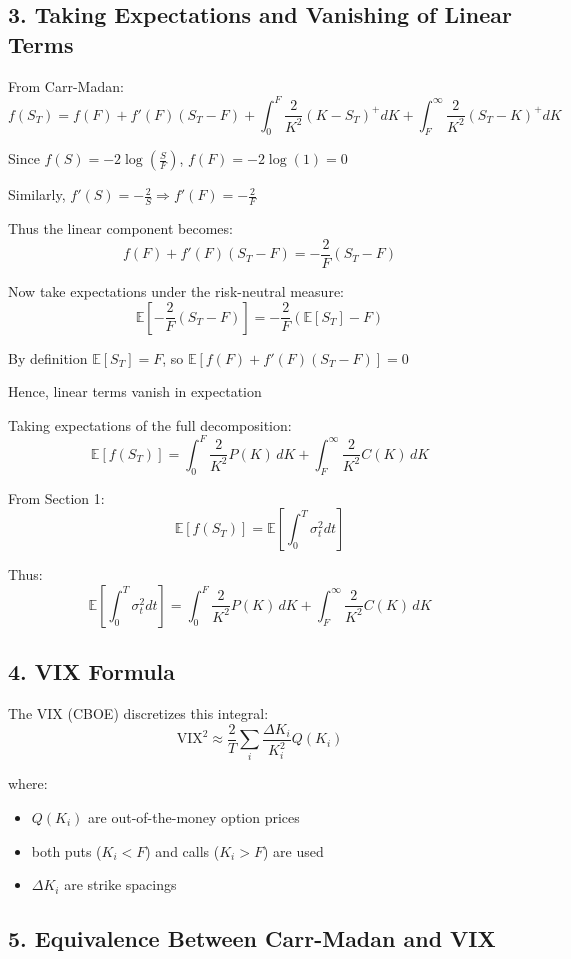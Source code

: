 \documentclass{article}
\begin{document}
\subsection*{3. Taking Expectations and Vanishing of Linear Terms}

From Carr-Madan:
\[
f(S_T)
= f(F) + f'(F)(S_T - F)
+ \int_0^F \frac{2}{K^2}(K - S_T)^+ dK
+ \int_F^\infty \frac{2}{K^2}(S_T - K)^+ dK
\]

Since
$f(S) = -2\log\left(\frac{S}{F}\right)$, 
$f(F) = -2\log(1) = 0$ 

Similarly, $f'(S) = -\frac{2}{S} \Rightarrow f'(F) = -\frac{2}{F}$

Thus the linear component becomes:
\[
f(F) + f'(F)(S_T - F) = -\frac{2}{F}(S_T - F)
\]

Now take expectations under the risk-neutral measure:
\[
\mathbb{E}\left[-\frac{2}{F}(S_T - F)\right]
= -\frac{2}{F}\left(\mathbb{E}[S_T] - F\right)
\]

By definition
$\mathbb{E}[S_T] = F$, so 
$\mathbb{E}\left[f(F) + f'(F)(S_T - F)\right] = 0$

Hence, linear terms vanish in expectation

Taking expectations of the full decomposition:
\[
\mathbb{E}[f(S_T)]
=
\int_0^F \frac{2}{K^2} P(K)\, dK
+ \int_F^\infty \frac{2}{K^2} C(K)\, dK
\]

From Section 1:
\[
\mathbb{E}[f(S_T)]
= \mathbb{E}\left[\int_0^T \sigma_t^2 dt\right]
\]

Thus:
\[
\mathbb{E}\left[\int_0^T \sigma_t^2 dt\right]
=
\int_0^F \frac{2}{K^2} P(K)\, dK
+ \int_F^\infty \frac{2}{K^2} C(K)\, dK
\]
\subsection*{4. VIX Formula}

The VIX (CBOE) discretizes this integral:
\[
\text{VIX}^2
\approx \frac{2}{T} \sum_i \frac{\Delta K_i}{K_i^2} Q(K_i)
\]

where:
\begin{itemize}
\item $Q(K_i)$ are out-of-the-money option prices
\item both puts ($K_i < F$) and calls ($K_i > F$) are used
\item $\Delta K_i$ are strike spacings
\end{itemize}

\subsection*{5. Equivalence Between Carr-Madan and VIX}
\end{document}

